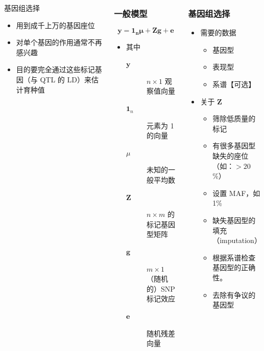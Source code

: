 \documentclass[serif,aspectratio=169]{beamer}
\begin{document}
\begin{frame}
\begin{columns}
\begin{frame}
  \pause
  \begin{block}{基因组选择}
    \begin{itemize}
    \item 用到成千上万的基因座位
    \item 对单个基因的作用通常不再感兴趣
    \item 目的要完全通过这些标记基因（与 QTL 的 LD）来估计育种值
    \end{itemize}
  \end{block}
\end{frame}


\begin{frame}
  \frametitle{一般模型}
  $$\mathbf{y=1_n\mu+Zg+e}$$
  \begin{itemize}
  \item 其中
    \begin{description}
    \item [$\mathbf{y}$] $n\times 1$ 观察值向量
    \item [$\mathbf{1}_n$] 元素为 1 的向量
    \item [$\mu$] 未知的一般平均数
    \item [$\mathbf{Z}$] $n\times m$ 的标记基因型矩阵
    \item [$\mathbf{g}$] $m\times 1$ （随机的）SNP 标记效应
    \item [$\mathbf{e}$] 随机残差向量
    \end{description}
  \end{itemize}
\end{frame}


\begin{frame}
  \frametitle{基因组选择}
  \begin{itemize}
  \item 需要的数据
    \begin{itemize}
    \item 基因型
    \item 表现型
    \item 系谱【可选】
    \end{itemize}
  \item 关于 $\mathbf{Z}$
    \begin{itemize}
    \item 筛除低质量的标记
    \item 有很多基因型缺失的座位（如：$>20$\%）
    \item 设置 MAF，如 1\%
    \item 缺失基因型的填充（imputation）
    \item 根据系谱检查基因型的正确性。
    \item 去除有争议的基因型
    \end{itemize}
  \end{itemize}
\end{frame}



\end{columns}
\end{frame}
\end{document}
